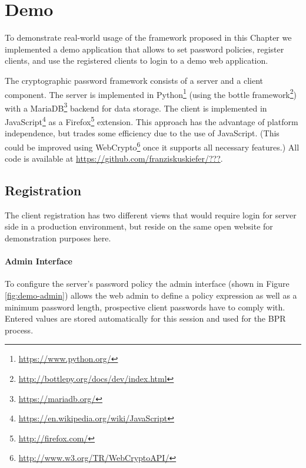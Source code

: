 \section{Demo} \label{sec:vpake-demo}

To demonstrate real-world usage of the framework proposed in this Chapter we implemented a demo application that allows to set password policies, register clients, and use the registered clients to login to a demo web application.

The cryptographic password framework consists of a server and a client component.
The server is implemented in Python\footnote{\url{https://www.python.org/}} (using the bottle framework\footnote{\url{http://bottlepy.org/docs/dev/index.html}}) with a MariaDB\footnote{\url{https://mariadb.org/}} backend for data storage.
The client is implemented in JavaScript\footnote{\url{https://en.wikipedia.org/wiki/JavaScript}} as a Firefox\footnote{\url{http://firefox.com/}} extension.
This approach has the advantage of platform independence, but trades some efficiency due to the use of JavaScript.
(This could be improved using WebCrypto\footnote{\url{http://www.w3.org/TR/WebCryptoAPI/}} once it supports all necessary features.)
All code is available at \url{https://github.com/franziskuskiefer/???}.

\subsection{Registration}
The client registration has two different views that would require login for server side in a production environment, but reside on the same open website for demonstration purposes here.

\paragraph{Admin Interface}
To configure the server's password policy the admin interface (shown in Figure \ref{fig:demo-admin}) allows the web admin to define a policy expression as well as a minimum password length, prospective client passwords have to comply with.
Entered values are stored automatically for this session and used for the \ac{BPR} process.


